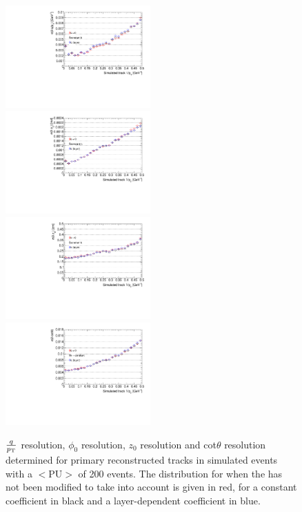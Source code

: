 \begin{figure}[htb]
\centering
\includegraphics[width=0.495\textwidth]{figs/tk-upgrade/results-lowPtTracking/qOverPtResVsInvPtTiltedGeometry_5000.pdf}
\includegraphics[width=0.495\textwidth]{figs/tk-upgrade/results-lowPtTracking/phi0ResVsInvPtTiltedGeometry_5000.pdf}
\\
\includegraphics[width=0.495\textwidth]{figs/tk-upgrade/results-lowPtTracking/z0ResVsInvPtTiltedGeometry_5000.pdf}
\includegraphics[width=0.495\textwidth]{figs/tk-upgrade/results-lowPtTracking/cotThetaResVsInvPtTiltedGeometry_5000.pdf}
\caption{$\frac{q}{p_{\mathrm{T}}}$ resolution, $\phi_{0}$ resolution, $z_{0}$ resolution and cot$\theta$ resolution determined for primary reconstructed tracks in simulated \ttbar events with a $<\textrm{PU}>$ of 200 events. The distribution for when the \KF has not been modified to take \MS into account is given in red, for a constant \MS coefficient in black and a layer-dependent \MS coefficient in blue.
}
\label{fig:kfHelixParametersResVsInvPt}
\end{figure}

